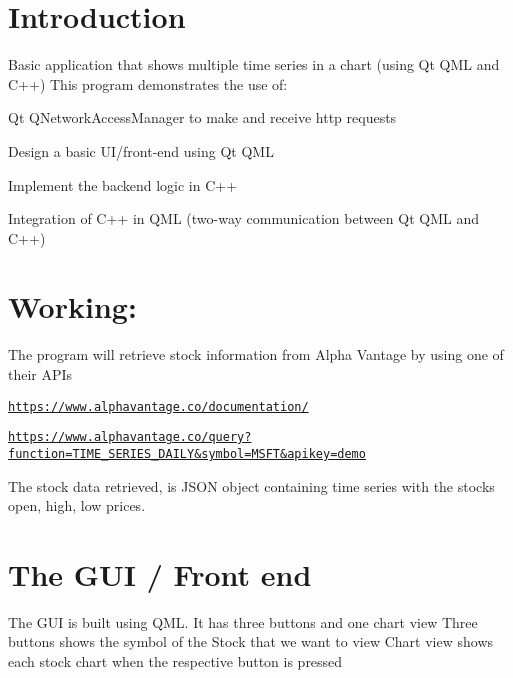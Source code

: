 \hypertarget{index_intro_sec}{}\section{Introduction}\label{index_intro_sec}
Basic application that shows multiple time series in a chart (using Qt Q\+ML and C++) This program demonstrates the use of\+: \begin{DoxyItemize}
\item Qt Q\+Network\+Access\+Manager to make and receive http requests \item Design a basic U\+I/front-\/end using Qt Q\+ML \item Implement the backend logic in C++ \item Integration of C++ in Q\+ML (two-\/way communication between Qt Q\+ML and C++) ~\newline
 ~\newline
 ~\newline
\end{DoxyItemize}
\hypertarget{index_how_sec}{}\section{Working\+:}\label{index_how_sec}
The program will retrieve stock information from Alpha Vantage by using one of their A\+P\+Is \begin{DoxyItemize}
\item {\ttfamily \href{https://www.alphavantage.co/documentation/}{\tt https\+://www.\+alphavantage.\+co/documentation/}} \item {\ttfamily \href{https://www.alphavantage.co/query?function=TIME_SERIES_DAILY&symbol=MSFT&apikey=demo}{\tt https\+://www.\+alphavantage.\+co/query?function=\+T\+I\+M\+E\+\_\+\+S\+E\+R\+I\+E\+S\+\_\+\+D\+A\+I\+L\+Y\&symbol=\+M\+S\+F\+T\&apikey=demo}} \end{DoxyItemize}
The stock data retrieved, is J\+S\+ON object containing time series with the stock\textquotesingle{}s open, high, low prices. ~\newline
 ~\newline
 ~\newline
\hypertarget{index_gui_sec}{}\section{The G\+U\+I / Front end}\label{index_gui_sec}
The G\+UI is built using Q\+ML. It has three buttons and one chart view Three buttons shows the symbol of the Stock that we want to view Chart view shows each stock chart when the respective button is pressed  